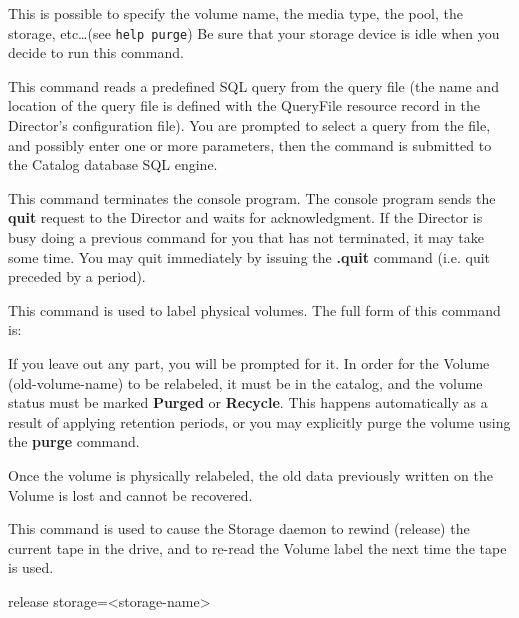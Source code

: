 \begin{description}
{This is possible to specify the volume name, the media type, the pool, the
storage, etc\dots (see \texttt{help purge}) Be sure that your storage device is
idle when you decide to run this command.

\item [query]
   This command reads a predefined SQL query from  the query file (the name and
   location of the  query file is defined with the QueryFile resource record in
   the Director's configuration file). You are prompted to select  a query from
   the file, and possibly enter one or more parameters,  then the command is
   submitted to the Catalog database SQL engine.

\item [quit]
   This command terminates the console program. The  console program sends the
   {\bf quit} request to the Director  and waits for acknowledgment. If the
   Director is busy doing  a previous command for you that has not terminated, it
   may  take some time. You may quit immediately by issuing the  {\bf .quit}
   command (i.e. quit preceded by a period).

\item [relabel]
   This command is used to label physical volumes.  The full form of this
   command is:


   If you leave out any part, you will be prompted for it.  In order for
   the Volume (old-volume-name) to be relabeled, it must be in the catalog,
   and the volume status must be marked {\bf Purged} or {\bf Recycle}.
   This happens automatically as a result of applying retention periods, or
   you may explicitly purge the volume using the {\bf purge} command.

   Once the volume is physically relabeled, the old data previously written
   on the Volume is lost and cannot be recovered.

\item [release]
   This command is used to cause the Storage daemon to rewind (release) the
   current tape in the drive, and to re-read the Volume label the next time
   the tape is used.

release storage={\textless}storage-name{\textgreater}

}
\end{description}
